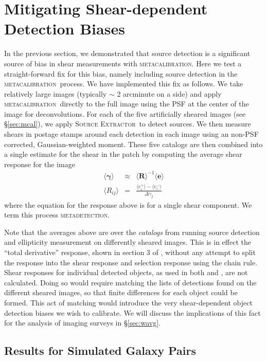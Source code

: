 \documentclass[fleqn,useAMS,usenatbib]{mnras}
\newcommand{\mcal}{\textsc{metacalibration}}
\newcommand{\mdet}{\textsc{metadetection}}
\newcommand{\sx}{\textsc{Source Extractor}}
\begin{document}
\section{Mitigating Shear-dependent Detection Biases}
\label{sec:mitigate}

In the previous section, we demonstrated that source detection is a significant
source of bias in shear measurements with \mcal. Here we test a
straight-forward fix for this bias, namely including source detection in the
\mcal\ process. We have implemented this fix as follows. We take relatively
large images (typically $\sim$ 2 arcminute on a side) and apply \mcal\ directly
to the full image using the PSF at the center of the image for deconvolutions.
For each of the five artificially sheared images (see \S \ref{sec:mcal}), we
apply \sx\ to detect sources. We then measure shears in postage stamps around
each detection in each image using an non-PSF corrected, Gaussian-weighted
moment.  These five catalogs are then combined into a single estimate for the
shear in the patch by computing the average shear response for the image
\begin{eqnarray}
\langle \boldsymbol\gamma \rangle &\approx& \langle \boldsymbol{R}\rangle^{-1}\langle\boldsymbol{e}\rangle\\
\langle R_{ij}\rangle &=& \frac{\langle e_i^{+}\rangle - \langle e_i^{-}\rangle}{\Delta\gamma_j}
\end{eqnarray}
where the equation for the response above is for a single shear component. We term this
process \mdet.

Note that the averages above are over the {\it catalogs} from running source
detection and ellipticity measurement on differently sheared images. This is in
effect the ``total derivative'' response, shown in section 3 of
\cite{SheldonMcal2017}, without any attempt to split the response into the
shear response and selection response using the chain rule.  Shear responses
for individual detected objects, as used in both \cite{SheldonMcal2017} and
\cite{HuffMcal2017}, are not calculated.  Doing so would require matching the
lists of detections found on the different sheared images, so that finite
differences for each object could be formed.  This act of matching would
introduce the very shear-dependent object detection biases we wish to
calibrate.  We will discuss the implications of this fact for the analysis of
imaging surveys in \S \ref{sec:wavg}.

\subsection{Results for Simulated Galaxy Pairs}
\label{sec:mdetpairs}
\end{document}
